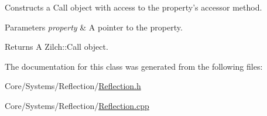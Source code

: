 Constructs a Call object with access to the property's accessor method. 


\begin{DoxyParams}{Parameters}
{\em property} & A pointer to the property. \\
\hline
\end{DoxyParams}
\begin{DoxyReturn}{Returns}
A Zilch\-::\-Call object. 
\end{DoxyReturn}


The documentation for this class was generated from the following files\-:\begin{DoxyCompactItemize}
\item 
Core/\-Systems/\-Reflection/\hyperlink{Reflection_8h}{Reflection.\-h}\item 
Core/\-Systems/\-Reflection/\hyperlink{Reflection_8cpp}{Reflection.\-cpp}\end{DoxyCompactItemize}
